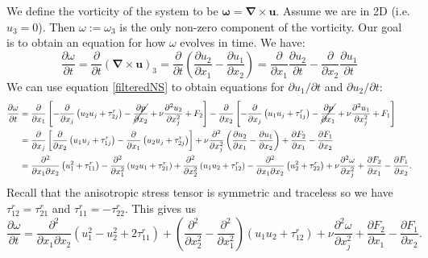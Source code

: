 \documentclass[11pt,a4paper]{article}
\begin{document}
We define the vorticity of the system to be $\boldsymbol{\omega} = \boldsymbol{\nabla}\times\boldsymbol{u}$. Assume we are in 2D (i.e. $u_3=0$). Then $\omega:= \omega_3$ is the only non-zero component of the vorticity. Our goal is to obtain an equation for how $\omega$ evolves in time. We have:
$$\frac{\partial \omega}{\partial t} = \frac{\partial }{\partial t}\left( \boldsymbol{\nabla}\times\boldsymbol{u}\right)_{3} =  \frac{\partial }{\partial t}\left(\frac{\partial u_2}{\partial x_1} -\frac{\partial u_1}{\partial x_2} \right)=  \frac{\partial }{\partial x_1}\frac{\partial u_2}{\partial t} -\frac{\partial }{\partial x_2}\frac{\partial u_1}{\partial t}$$
We can use equation \ref{filteredNS} to obtain equations for ${\partial u_1}/{\partial t}$ and ${\partial u_2}/{\partial t}$:
\begin{align*}
\frac{\partial \omega}{\partial t} &= \frac{\partial }{\partial x_1}\left[- \frac{\partial }{\partial x_j}\left({u}_2{u}_j +\tau_{2j}^r\right)-\cancel{\frac{\partial {p}}{\partial x_2}}+  \nu \frac{\partial^2u_2}{\partial x_j^2}+ {F}_2\right]-\frac{\partial }{\partial x_2}\left[- \frac{\partial }{\partial x_j}\left({u}_1{u}_j +\tau_{1j}^r\right)-\cancel{\frac{\partial {p}}{\partial x_1}}+ \nu \frac{\partial^2u_1}{\partial x_j^2}+ {F}_1\right]\\
&= \frac{\partial }{\partial x_j}\left[ \frac{\partial }{\partial x_2}\left({u}_1{u}_j +\tau_{1j}^r\right) - \frac{\partial }{\partial x_1}\left({u}_2{u}_j +\tau_{2j}^r\right)\right] +\nu \frac{\partial^2}{\partial x_j^2}\left(\frac{\partial u_2}{\partial x_1} -\frac{\partial u_1}{\partial x_2}\right) +\frac{\partial F_2}{\partial x_1} -\frac{\partial F_1}{\partial x_2}\\
&= \frac{\partial^2 }{\partial x_1\partial x_2}\left({u}_1^2 +\tau_{11}^r\right) - \frac{\partial^2 }{\partial x_1^2}\left({u}_2{u}_1 +\tau_{21}^r\right)+\frac{\partial^2 }{\partial x_2^2}\left({u}_1{u}_2 +\tau_{12}^r\right) - \frac{\partial^2 }{\partial x_1\partial x_2}\left({u}_2^2+\tau_{22}^r\right) +\nu \frac{\partial^2\omega}{\partial x_j^2}+\frac{\partial F_2}{\partial x_1} -\frac{\partial F_1}{\partial x_2}.
\end{align*}
Recall that the anisotropic stress tensor is symmetric and traceless so we have $\tau_{12}^r=\tau_{21}^r$ and $\tau_{11}^r = -\tau_{22}^r$. This gives us
$$\frac{\partial \omega}{\partial t} = \frac{\partial^2 }{\partial x_1\partial x_2}\left({u}_1^2 -{u}_2^2+2\tau_{11}^r\right) +\left(\frac{\partial^2 }{\partial x_2^2} - \frac{\partial^2 }{\partial x_1^2}\right)\left({u}_1{u}_2 +\tau_{12}^r\right) +\nu \frac{\partial^2\omega}{\partial x_j^2}+\frac{\partial F_2}{\partial x_1} -\frac{\partial F_1}{\partial x_2}.$$
\end{document}
